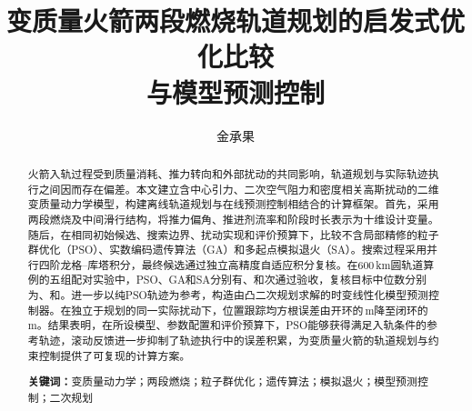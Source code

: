\documentclass[UTF8,fontset=fandol,11pt,a4paper]{ctexart}
\title{\heiti 变质量火箭两段燃烧轨道规划的启发式优化比较\\与模型预测控制}
\author{金承果}\date{}
\begin{document}
\maketitle
\begin{abstract}
火箭入轨过程受到质量消耗、推力转向和外部扰动的共同影响，轨道规划与实际轨迹执行之间因而存在偏差。本文建立含中心引力、二次空气阻力和密度相关高斯扰动的二维变质量动力学模型，构建离线轨道规划与在线预测控制相结合的计算框架。首先，采用两段燃烧及中间滑行结构，将推力偏角、推进剂流率和阶段时长表示为十维设计变量。随后，在相同初始候选、搜索边界、扰动实现和评价预算下，比较不含局部精修的粒子群优化（PSO）、实数编码遗传算法（GA）和多起点模拟退火（SA）。搜索过程采用并行四阶龙格--库塔积分，最终候选通过独立高精度自适应积分复核。在600\,km圆轨道算例的五组配对实验中，PSO、GA和SA分别有\PSOPass、\GAPass 和\SAPass 次通过验收，复核目标中位数分别为\PSOMedian、\GAMedian 和\SAMedian。进一步以纯PSO轨迹为参考，构造由凸二次规划求解的时变线性化模型预测控制器。在独立于规划的同一实际扰动下，位置跟踪均方根误差由开环的\OpenPos\,m降至闭环的\ClosedPos\,m。结果表明，在所设模型、参数配置和评价预算下，PSO能够获得满足入轨条件的参考轨迹，滚动反馈进一步抑制了轨迹执行中的误差积累，为变质量火箭的轨道规划与约束控制提供了可复现的计算方案。
\vspace{.4em}\par\noindent\textbf{关键词：}变质量动力学；两段燃烧；粒子群优化；遗传算法；模拟退火；模型预测控制；二次规划
\end{abstract}






\FloatBarrier



\appendix
\FloatBarrier
{\small\raggedright\linespread{1.0}\selectfont}
\end{document}
